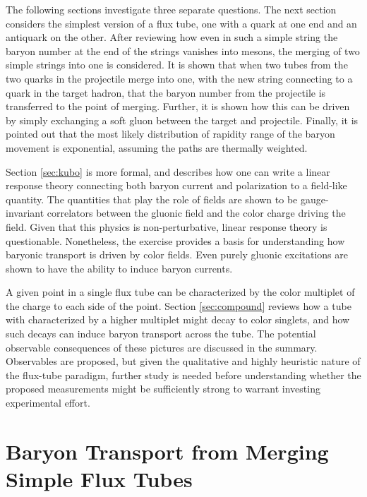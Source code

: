\documentclass[aps, prc, 12pt, nofootinbib, showpacs, superscriptaddress, tightenlines, groupedaddress]{revtex4-2}
\begin{document}
The following sections investigate three separate questions. The next section considers the simplest version of a flux tube, one with a quark at one end and an antiquark on the other. After reviewing how even in such a simple string the baryon number at the end of the strings vanishes into mesons, the merging of two simple strings into one is considered. It is shown that when two tubes from the two quarks in the projectile merge into one, with the new string connecting to a quark in the target hadron, that the baryon number from the projectile is transferred to the point of merging. Further, it is shown how this can be driven by simply exchanging a soft gluon between the target and projectile. Finally, it is pointed out that the most likely distribution of rapidity range of the baryon movement is exponential, assuming the paths are thermally weighted.

Section \ref{sec:kubo} is more formal, and describes how one can write a linear response theory connecting both baryon current and polarization to a field-like quantity. The quantities that play the role of fields are shown to be gauge-invariant correlators between the gluonic field and the color charge driving the field. Given that this physics is non-perturbative, linear response theory is questionable. Nonetheless, the exercise provides a basis for understanding how baryonic transport is driven by color fields. Even purely gluonic excitations are shown to have the ability to induce baryon currents.

A given point in a single flux tube can be characterized by the color multiplet of the charge to each side of the point. Section \ref{sec:compound} reviews how a tube with characterized by a higher multiplet might decay to color singlets, and how such decays can induce baryon transport across the tube. The potential observable consequences of these pictures are discussed in the summary. Observables are proposed, but given the qualitative and highly heuristic nature of the flux-tube paradigm, further study is needed before understanding whether the proposed measurements  might be sufficiently strong to warrant investing experimental effort. 

\section{Baryon Transport from Merging Simple Flux Tubes}\label{sec:simple}
\end{document}
